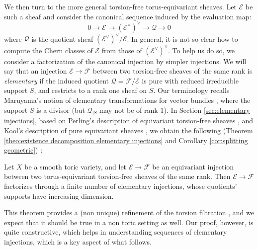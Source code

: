 \documentclass[a4paper,10pt]{amsart}
\theoremstyle{plain}{
    \newtheorem{theorem}{Theorem}[section]
    \newtheorem{lemma}[theorem]{Lemma}
    \newtheorem{corollary}[theorem]{Corollary}
    \newtheorem{proposition}[theorem]{Proposition}
    \newtheorem{conjecture}[theorem]{Conjecture}
}
\theoremstyle{definition}{
    \newtheorem{definition}[theorem]{Definition}
    \newtheorem{defn-thm}[theorem]{Definition-Theorem}
    \newtheorem{example}[theorem]{Example}
    \newtheorem{notation}[theorem]{Notation}
}
\theoremstyle{remark}{
    \newtheorem{remark}[theorem]{Remark}
    \newtheorem{problem}[theorem]{Problem}
    \newtheorem{question}[theorem]{Question}
}
\def\cF{\mathcal{F}}
\def\cE{\mathcal{E}}
\def\cQ{\mathcal{Q}}
\begin{document}
We then turn to the more general torsion-free torus-equivariant sheaves. Let $\cE$ be such a sheaf and consider the canonical sequence induced by the evaluation map:
$$
0\to\cE\to(\cE^\vee)^\vee\to\cQ\to 0
$$
where $\cQ$ is the quotient sheaf $(\cE^\vee)^\vee/\cE$. In general, it is not so clear how to compute the Chern classes of $\cE$ from those of $(\cE^\vee)^\vee$. To help us do so, we consider a factorization of the canonical injection by simpler injections. We will say that an injection $\cE\to\cF$ between two torsion-free sheaves of the same rank is {\it elementary} if the induced quotient $\cQ=\cF/\cE$ is pure with reduced irreducible support $S$, and restricts to a rank one sheaf on $S$. Our terminology recalls Maruyama's notion of elementary transformations for vector bundles \cite{Maru}, where the support $S$ is a divisor (but $\cQ_{\vert S}$ may not be of rank $1$). In Section \ref{sec:elementary injections}, based on Perling's description of equivariant torsion-free sheaves \cite{Per04}, and Kool's description of pure equivariant sheaves \cite{Koo11}, we obtain the following (Theorem \ref{theo:existence decomposition elementary injections} and Corollary \ref{cor:splitting geometric}) :
\begin{theorem}
 \label{theo:intro factorization}
 Let $X$ be a smooth toric variety, and let $\cE\to\cF$ be an equivariant injection between two torus-equivariant torsion-free sheaves of the same rank. Then $\cE\to \cF$ factorizes through a finite number of elementary injections, whose quotients' supports have increasing dimension.
\end{theorem}
This theorem provides a (non unique) refinement of the 
 torsion filtration \cite[Chapter 1, section 1]{HuLe}, and we expect that it should be true in a non toric setting as well. Our proof, however, is quite constructive, which helps in understanding sequences of elementary injections, which is a key aspect of what follows.
 
\end{document}
